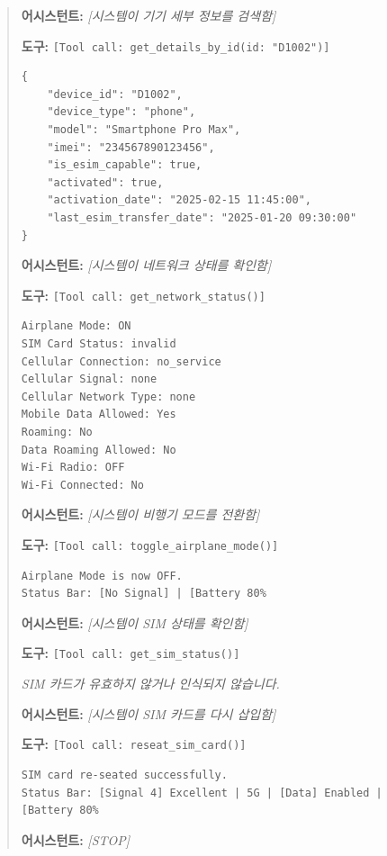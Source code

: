 \begin{quote}
\vspace{0.5em}
\noindent\textbf{어시스턴트:} \textit{[시스템이 기기 세부 정보를 검색함]}

\vspace{0.5em}
\noindent\textbf{도구:} \texttt{[Tool call: get\_details\_by\_id(id: "D1002")]}

\begin{verbatim}
{
    "device_id": "D1002",
    "device_type": "phone",
    "model": "Smartphone Pro Max",
    "imei": "234567890123456",
    "is_esim_capable": true,
    "activated": true,
    "activation_date": "2025-02-15 11:45:00",
    "last_esim_transfer_date": "2025-01-20 09:30:00"
}
\end{verbatim}

\vspace{0.5em}
\noindent\textbf{어시스턴트:} \textit{[시스템이 네트워크 상태를 확인함]}

\vspace{0.5em}
\noindent\textbf{도구:} \texttt{[Tool call: get\_network\_status()]}

\begin{verbatim}
Airplane Mode: ON
SIM Card Status: invalid
Cellular Connection: no_service
Cellular Signal: none
Cellular Network Type: none
Mobile Data Allowed: Yes
Roaming: No
Data Roaming Allowed: No
Wi-Fi Radio: OFF
Wi-Fi Connected: No
\end{verbatim}

\vspace{0.5em}
\noindent\textbf{어시스턴트:} \textit{[시스템이 비행기 모드를 전환함]}

\vspace{0.5em}
\noindent\textbf{도구:} \texttt{[Tool call: toggle\_airplane\_mode()]}

\begin{verbatim}
Airplane Mode is now OFF.
Status Bar: [No Signal] | [Battery 80%
\end{verbatim}

\vspace{0.5em}
\noindent\textbf{어시스턴트:} \textit{[시스템이 SIM 상태를 확인함]}

\vspace{0.5em}
\noindent\textbf{도구:} \texttt{[Tool call: get\_sim\_status()]}

\textit{SIM 카드가 유효하지 않거나 인식되지 않습니다.}

\vspace{0.5em}
\noindent\textbf{어시스턴트:} \textit{[시스템이 SIM 카드를 다시 삽입함]}

\vspace{0.5em}
\noindent\textbf{도구:} \texttt{[Tool call: reseat\_sim\_card()]}

\begin{verbatim}
SIM card re-seated successfully.
Status Bar: [Signal 4] Excellent | 5G | [Data] Enabled | [Battery 80%
\end{verbatim}

\vspace{0.5em}
\noindent\textbf{어시스턴트:} \textit{[STOP]}
\end{quote}
